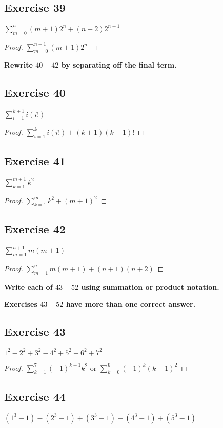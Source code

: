\documentclass[14pt]{extarticle}
\newcommand{\dps}{\displaystyle}
\newcommand{\cy}{\color{cyan}}
\begin{document}
\subsection{Exercise 39}
$\dps\sum_{m=0}^{n}(m+1)2^n + (n+2)2^{n+1}$

\begin{proof}
    $\dps\sum_{m=0}^{n+1}(m+1)2^n$
\end{proof}

{\bf\cy Rewrite $40-42$ by separating off the final term.}

\subsection{Exercise 40}
$\dps\sum_{i=1}^{k+1}i(i!)$

\begin{proof}
    $\dps\sum_{i=1}^{k}i(i!) + (k+1)(k+1)!$
\end{proof}

\subsection{Exercise 41}
$\dps\sum_{k=1}^{m+1}k^2$

\begin{proof}
    $\dps\sum_{k=1}^{m}k^2 + (m+1)^2$
\end{proof}

\subsection{Exercise 42}
$\dps\sum_{m=1}^{n+1}m(m+1)$

\begin{proof}
    $\dps\sum_{m=1}^{n}m(m+1) + (n+1)(n+2)$
\end{proof}

{\bf\cy Write each of $43-52$ using summation or product
notation.}

{\bf\cy Exercises $43-52$ have more than one correct answer.}

\subsection{Exercise 43}
$1^2 - 2^2 + 3^2 - 4^2 + 5^2 - 6^2 + 7^2$

\begin{proof}
    $\dps \sum_{k=1}^{7}(-1)^{k+1}k^2$ or $\dps \sum_{k=0}^{6}(-1)^{k}(k+1)^2$
\end{proof}

\subsection{Exercise 44}
$(1^3 - 1) - (2^3 - 1) + (3^3 - 1) - (4^3 - 1) + (5^3 - 1)$
\end{document}
